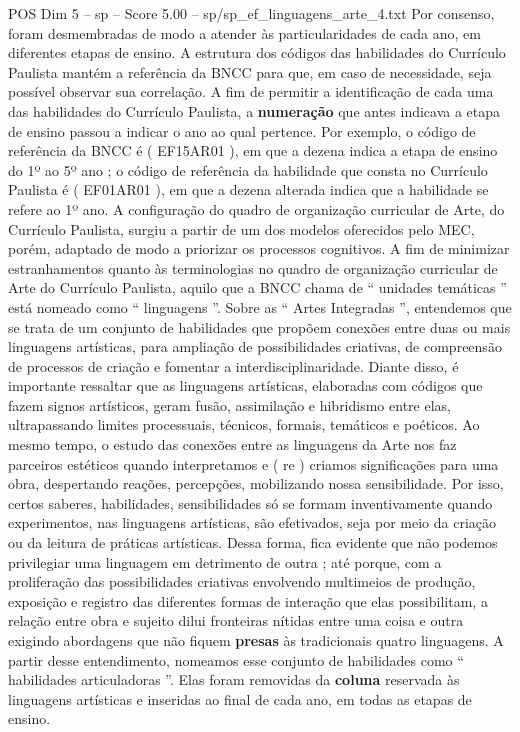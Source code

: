 \begin{textsample}{POS Dim 5 – sp – Score 5.00 – sp/sp\_ef\_linguagens\_arte\_4.txt}
Por consenso, foram desmembradas de modo a atender às particularidades de cada ano, em diferentes etapas de ensino.
A estrutura dos códigos das habilidades do Currículo Paulista mantém a referência da BNCC para que, em caso de necessidade, seja possível observar sua correlação.
A fim de permitir a identificação de cada uma das habilidades do Currículo Paulista, a \textbf{numeração} que antes indicava a etapa de ensino passou a indicar o ano ao qual pertence.
Por exemplo, o código de referência da BNCC é ( EF15AR01 ), em que a dezena indica a etapa de ensino do 1º ao 5º ano ; o código de referência da habilidade que consta no Currículo Paulista é ( EF01AR01 ), em que a dezena alterada indica que a habilidade se refere ao 1º ano.
A configuração do quadro de organização curricular de Arte, do Currículo Paulista, surgiu a partir de um dos modelos oferecidos pelo MEC, porém, adaptado de modo a priorizar os processos cognitivos.
A fim de minimizar estranhamentos quanto às terminologias no quadro de organização curricular de Arte do Currículo Paulista, aquilo que a BNCC chama de “ unidades temáticas ” está nomeado como “ linguagens ”.
Sobre as “ Artes Integradas ”, entendemos que se trata de um conjunto de habilidades que propõem conexões entre duas ou mais linguagens artísticas, para ampliação de possibilidades criativas, de compreensão de processos de criação e fomentar a interdisciplinaridade.
Diante disso, é importante ressaltar que as linguagens artísticas, elaboradas com códigos que fazem signos artísticos, geram fusão, assimilação e hibridismo entre elas, ultrapassando limites processuais, técnicos, formais, temáticos e poéticos.
Ao mesmo tempo, o estudo das conexões entre as linguagens da Arte nos faz parceiros estéticos quando interpretamos e ( re ) criamos significações para uma obra, despertando reações, percepções, mobilizando nossa sensibilidade.
Por isso, certos saberes, habilidades, sensibilidades só se formam inventivamente quando experimentos, nas linguagens artísticas, são efetivados, seja por meio da criação ou da leitura de práticas artísticas.
Dessa forma, fica evidente que não podemos privilegiar uma linguagem em detrimento de outra ; até porque, com a proliferação das possibilidades criativas envolvendo multimeios de produção, exposição e registro das diferentes formas de interação que elas possibilitam, a relação entre obra e sujeito dilui fronteiras nítidas entre uma coisa e outra exigindo abordagens que não fiquem \textbf{presas} às tradicionais quatro linguagens.
A partir desse entendimento, nomeamos esse conjunto de habilidades como “ habilidades articuladoras ”.
Elas foram removidas da \textbf{coluna} reservada às linguagens artísticas e inseridas ao final de cada ano, em todas as etapas de ensino.

\end{textsample}
